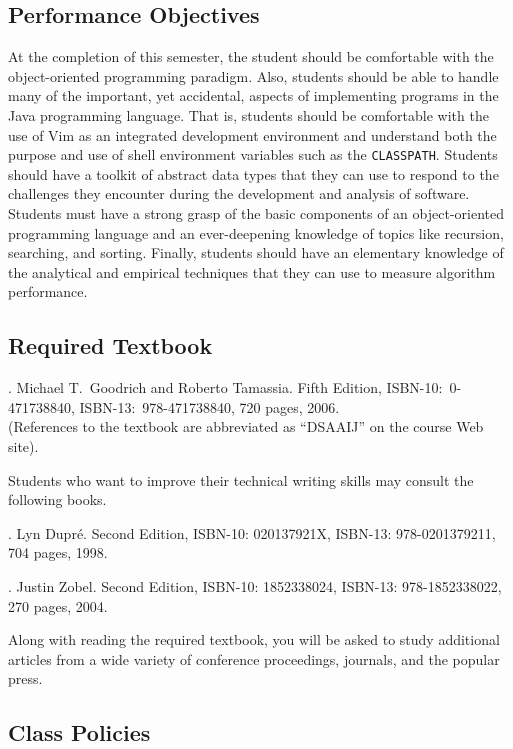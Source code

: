 \subsection*{Performance Objectives}

At the completion of this semester, the student should be comfortable with the object-oriented programming paradigm.
Also, students should be able to handle many of the important, yet accidental, aspects of implementing programs in the
Java programming language.  That is, students should be comfortable with the use of Vim as an integrated development
environment and understand both the purpose and use of shell environment variables such as the {\tt CLASSPATH}.
Students should have a toolkit of abstract data types that they can use to respond to the challenges they encounter
during the development and analysis of software.  Students must have a strong grasp of the basic components of an
object-oriented programming language and an ever-deepening knowledge of topics like recursion, searching, and sorting.
Finally, students should have an elementary knowledge of the analytical and empirical techniques that they can use to
measure algorithm performance.

\subsection*{Required Textbook}

. Michael T.\ Goodrich and Roberto Tamassia.
Fifth Edition, ISBN-10:\ 0-471738840, ISBN-13:\ 978-471738840, 720 pages, 2006. \\
(References to the textbook are abbreviated as ``DSAAIJ'' on the course Web site).

\noindent
Students who want to improve their technical writing skills may consult the following books.

. Lyn Dupr\'e. Second Edition,  ISBN-10: 020137921X,
ISBN-13: 978-0201379211, 704 pages, 1998.

.  Justin Zobel. Second Edition,  ISBN-10: 1852338024, ISBN-13:
978-1852338022, 270 pages, 2004.

\noindent
Along with reading the required textbook, you will be asked to study additional articles from a wide variety of
conference proceedings, journals, and the popular press.

\subsection*{Class Policies}

